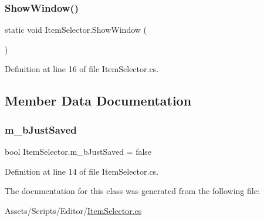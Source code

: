 \subsubsection{\texorpdfstring{Show\+Window()}{ShowWindow()}}
{\footnotesize\ttfamily static void Item\+Selector.\+Show\+Window (\begin{DoxyParamCaption}{ }\end{DoxyParamCaption})\hspace{0.3cm}{\ttfamily [static]}}



Definition at line 16 of file Item\+Selector.\+cs.



\subsection{Member Data Documentation}
\mbox{\label{class_item_selector_a657a76bb7b328dad50878398bd2b9dc7}} 
\subsubsection{\texorpdfstring{m\+\_\+b\+Just\+Saved}{m\_bJustSaved}}
{\footnotesize\ttfamily bool Item\+Selector.\+m\+\_\+b\+Just\+Saved = false\hspace{0.3cm}{\ttfamily [static]}}



Definition at line 14 of file Item\+Selector.\+cs.



The documentation for this class was generated from the following file\+:\begin{DoxyCompactItemize}
\item 
Assets/\+Scripts/\+Editor/\mbox{\hyperlink{_item_selector_8cs}{Item\+Selector.\+cs}}\end{DoxyCompactItemize}
